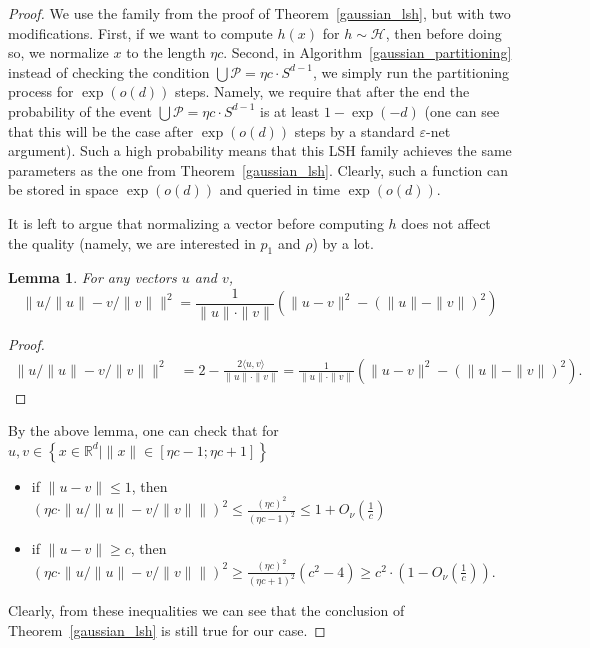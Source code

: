 \documentclass[11pt,letterpaper]{article}
\newtheorem{lemma}[theorem]{Lemma}
\newcommand{\set}[1]{\left\{#1\right\}}
\newcommand{\Rbb}{\mathbb{R}}
\newcommand{\eps}{\varepsilon}
\begin{document}
\begin{proof}
    We use the family from the proof of Theorem~\ref{gaussian_lsh}, but with two
    modifications. First, if we want to compute $h(x)$ for $h \sim \mathcal{H}$,
    then before doing so, we normalize $x$ to the length $\eta c$.
    Second, in Algorithm~\ref{gaussian_partitioning} instead of checking
    the condition $\bigcup \mathcal{P} = \eta c \cdot S^{d-1}$, we simply run the partitioning
    process for $\exp(o(d))$ steps. Namely, we require that
    after the end the probability of the event $\bigcup \mathcal{P} = \eta c \cdot S^{d-1}$
    is at least $1 - \exp(-d)$ (one can see that this will be the case
    after $\exp(o(d))$ steps by a standard $\eps$-net argument).
    Such a high probability means that this LSH family achieves the same parameters as
    the one from Theorem~\ref{gaussian_lsh}.
    Clearly, such a function can be stored in space $\exp(o(d))$
    and queried in time $\exp(o(d))$.

    It is left to argue that normalizing a vector before computing $h$
    does not affect the quality (namely, we are interested in $p_1$
    and $\rho$) by a lot.

\begin{lemma}
For any vectors $u$ and $v$,
$$\|u/\|u\| - v/\|v\|\|^2 = \frac{1}{\|u\|\cdot\|v\|}\left(\|u-v\|^2 - (\|u\|-\|v\|)^2\right)$$
\end{lemma}
\begin{proof}
  \begin{align*}    
    \|u/\|u\| - v/\|v\|\|^2 &= 2 - \frac{2\langle u,v\rangle}{\|u\|\cdot\|v\|}
    =\frac{1}{\|u\|\cdot\|v\|}\left(\|u-v\|^2 - (\|u\|-\|v\|)^2\right).
  \end{align*}
\end{proof}

    By the above lemma, one can check that for $u, v \in \set{x \in \Rbb^d \mid \|x\| \in [\eta c - 1; \eta c + 1]}$
    \begin{itemize}
        \item if $\|u - v\| \leq 1$, then
$
            (\eta c \cdot \|u / \|u\| - v / \|v\|\|)^2 \le \frac{(\eta c)^2}{(\eta c - 1)^2}
            \le 1 + O_{\nu}\left(\frac1c\right)
$
        \item if $\|u - v\| \geq c$, then
$ (\eta c \cdot \|u / \|u\| - v / \|v\|\|)^2 \ge \frac{(\eta c)^2}{(\eta c + 1)^2}(c^2 - 4)
            \ge c^2 \cdot \left(1 - O_{\nu}\left(\frac1c\right)\right).
$
    \end{itemize}
    Clearly, from these inequalities we can see that the conclusion of
    Theorem~\ref{gaussian_lsh} is still true for our case.
\end{proof}
\end{document}
